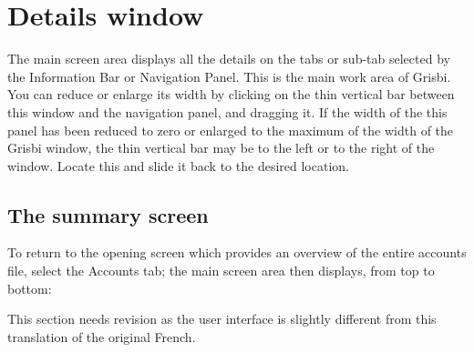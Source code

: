 \ifIllustration
\else
\newpage
\fi


\section{Details window\label{home-details}}

The main screen area displays all the details on the tabs or sub-tab selected by the Information Bar or Navigation Panel. This is the main work area of Grisbi.
You can reduce or enlarge its width by clicking on the thin vertical bar between this window and the navigation panel, and dragging it. If the width of the this panel has been reduced to zero or enlarged to the maximum of the width of the Grisbi window, the thin vertical bar may be to the left or to the right of the window.  Locate this and slide it back to the desired location.
 
\subsection{The summary screen\label{home-details-homepage}}

To return to the opening screen which provides an overview of the entire accounts file, select the Accounts tab; the main screen area then displays, from top to bottom:

 This section needs revision as the user interface is slightly different from this translation of the original French.

